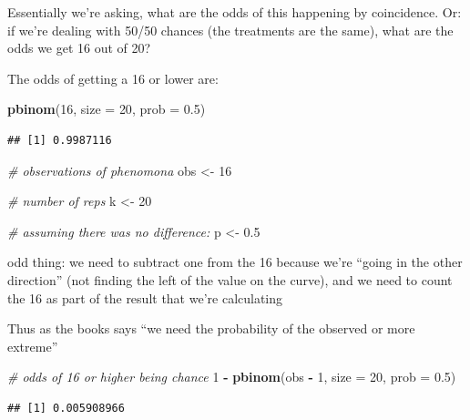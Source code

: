 \documentclass[]{article}
\newenvironment{Shaded}{\begin{snugshade}}{\end{snugshade}}
\newcommand{\KeywordTok}[1]{\textcolor[rgb]{0.13,0.29,0.53}{\textbf{#1}}}
\newcommand{\DataTypeTok}[1]{\textcolor[rgb]{0.13,0.29,0.53}{#1}}
\newcommand{\DecValTok}[1]{\textcolor[rgb]{0.00,0.00,0.81}{#1}}
\newcommand{\FloatTok}[1]{\textcolor[rgb]{0.00,0.00,0.81}{#1}}
\newcommand{\StringTok}[1]{\textcolor[rgb]{0.31,0.60,0.02}{#1}}
\newcommand{\CommentTok}[1]{\textcolor[rgb]{0.56,0.35,0.01}{\textit{#1}}}
\newcommand{\OperatorTok}[1]{\textcolor[rgb]{0.81,0.36,0.00}{\textbf{#1}}}
\newcommand{\NormalTok}[1]{#1}
\begin{document}
Essentially we're asking, what are the odds of this happening by
coincidence. Or: if we're dealing with 50/50 chances (the treatments are
the same), what are the odds we get 16 out of 20?

The odds of getting a 16 or lower are:

\begin{Shaded}
\begin{Highlighting}[]
\KeywordTok{pbinom}\NormalTok{(}\DecValTok{16}\NormalTok{, }\DataTypeTok{size =} \DecValTok{20}\NormalTok{, }\DataTypeTok{prob =} \FloatTok{0.5}\NormalTok{)}
\end{Highlighting}
\end{Shaded}

\begin{verbatim}
## [1] 0.9987116
\end{verbatim}

\begin{Shaded}
\begin{Highlighting}[]
\CommentTok{# observations of phenomona}
\NormalTok{obs <-}\StringTok{ }\DecValTok{16}

\CommentTok{# number of reps}
\NormalTok{k <-}\StringTok{ }\DecValTok{20}

\CommentTok{# assuming there was no difference:}
\NormalTok{p <-}\StringTok{ }\FloatTok{0.5}
\end{Highlighting}
\end{Shaded}

odd thing: we need to subtract one from the 16 because we're ``going in
the other direction'' (not finding the left of the value on the curve),
and we need to count the 16 as part of the result that we're calculating

Thus as the books says ``we need the probability of the observed or more
extreme''

\begin{Shaded}
\begin{Highlighting}[]
\CommentTok{# odds of 16 or higher being chance}
\DecValTok{1} \OperatorTok{-}\StringTok{ }\KeywordTok{pbinom}\NormalTok{(obs }\OperatorTok{-}\StringTok{ }\DecValTok{1}\NormalTok{, }\DataTypeTok{size =} \DecValTok{20}\NormalTok{, }\DataTypeTok{prob =} \FloatTok{0.5}\NormalTok{)}
\end{Highlighting}
\end{Shaded}

\begin{verbatim}
## [1] 0.005908966
\end{verbatim}
\end{document}
